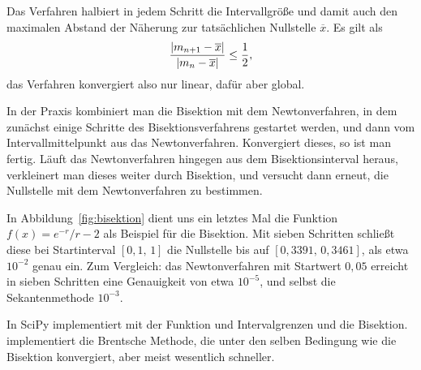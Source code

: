 Das Verfahren halbiert in jedem Schritt die Intervallgröße und damit
auch den maximalen Abstand der Näherung zur tatsächlichen
Nullstelle $\overline{x}$. Es gilt als
\begin{equation}
  \frac{\left\lvert{m_{n+1} - \overline{x}}\right\rvert}{\left\lvert{m_{n} - \overline{x}}\right\rvert}\le \frac{1}{2},
\end{equation}
das Verfahren konvergiert also nur linear, dafür aber global.

In der Praxis kombiniert man die Bisektion mit dem Newtonverfahren, in
dem zunächst einige Schritte des Bisektionsverfahrens gestartet
werden, und dann vom Intervallmittelpunkt aus das
Newtonverfahren. Konvergiert dieses, so ist man fertig. Läuft das
Newtonverfahren hingegen aus dem Bisektionsinterval heraus,
verkleinert man dieses weiter durch Bisektion, und versucht dann
erneut, die Nullstelle mit dem Newtonverfahren zu bestimmen.

In Abbildung~\ref{fig:bisektion} dient uns ein letztes Mal die
Funktion $f(x) = e^{-r}/r - 2$ als Beispiel für die Bisektion. Mit
sieben Schritten schließt diese bei Startinterval $[0,1,\,1]$ die
Nullstelle bis auf $[0,3391,\,0,3461]$, als etwa $10^{-2}$ genau
ein. Zum Vergleich: das Newtonverfahren mit Startwert $0,05$ erreicht
in sieben Schritten eine Genauigkeit von etwa $10^{-5}$, und selbst
die Sekantenmethode $10^{-3}$.

In SciPy implementiert  mit der
Funktion  und Intervalgrenzen  und  die
Bisektion.  implementiert die
Brentsche Methode, die unter den selben Bedingung wie die Bisektion
konvergiert, aber meist wesentlich schneller.

